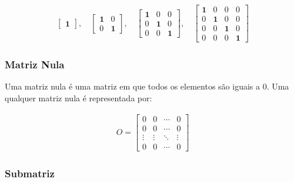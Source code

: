 \[
    \begin{matrix}
        \begin{bmatrix}
            \mathbf{1}
        \end{bmatrix},
        \quad
        \begin{bmatrix}
            \mathbf{1} & 0          \\
            0          & \mathbf{1}
        \end{bmatrix},
        \quad
        \begin{bmatrix}
            \mathbf{1} & 0          & 0          \\
            0          & \mathbf{1} & 0          \\
            0          & 0          & \mathbf{1}
        \end{bmatrix},
        \quad
        \begin{bmatrix}
            \mathbf{1} & 0          & 0          & 0          \\
            0          & \mathbf{1} & 0          & 0          \\
            0          & 0          & \mathbf{1} & 0          \\
            0          & 0          & 0          & \mathbf{1}
        \end{bmatrix}
    \end{matrix}
\]

\subsubsection{Matriz Nula}
\indent

Uma matriz nula é uma matriz em que todos os elementos são iguais a 0. Uma qualquer matriz nula é representada por:

\[
    \begin{matrix}
        O = \begin{bmatrix}
                0      & 0      & \cdots & 0      \\
                0      & 0      & \cdots & 0      \\
                \vdots & \vdots & \ddots & \vdots \\
                0      & 0      & \cdots & 0
            \end{bmatrix}
    \end{matrix}
\]

\subsubsection{Submatriz}
\indent

